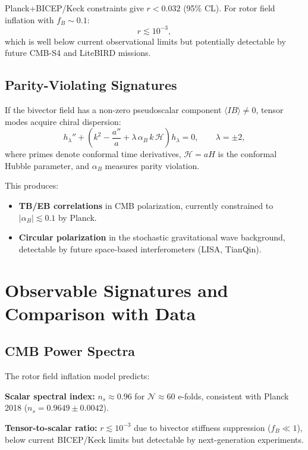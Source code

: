 \documentclass[11pt,a4paper]{article}
\numberwithin{equation}{section}
\theoremstyle{plain}
\theoremstyle{definition}
\theoremstyle{remark}
\begin{document}
Planck+BICEP/Keck constraints give $r < 0.032$ (95\% CL). For rotor field inflation with $f_B \sim 0.1$:
\begin{equation}
r \lesssim 10^{-3},
\end{equation}
which is well below current observational limits but potentially detectable by future CMB-S4 and LiteBIRD missions.

\subsection{Parity-Violating Signatures}

If the bivector field has a non-zero pseudoscalar component $\langle I B \rangle \neq 0$, tensor modes acquire chiral dispersion:
\begin{equation}
h_\lambda'' + \left(k^2 - \frac{a''}{a} + \lambda\,\alpha_B\,k\,\mathcal{H}\right)h_\lambda = 0,\qquad \lambda = \pm 2,
\label{eq:chiral-tensor}
\end{equation}
where primes denote conformal time derivatives, $\mathcal{H} = aH$ is the conformal Hubble parameter, and $\alpha_B$ measures parity violation.

This produces:
\begin{itemize}
  \item \textbf{TB/EB correlations} in CMB polarization, currently constrained to $|\alpha_B| \lesssim 0.1$ by Planck.
  \item \textbf{Circular polarization} in the stochastic gravitational wave background, detectable by future space-based interferometers (LISA, TianQin).
\end{itemize}

\section{Observable Signatures and Comparison with Data}
\label{sec:obs}

\subsection{CMB Power Spectra}

The rotor field inflation model predicts:

\textbf{Scalar spectral index:} $n_s \approx 0.96$ for $\mathcal{N} \approx 60$ e-folds, consistent with Planck 2018 ($n_s = 0.9649 \pm 0.0042$).

\textbf{Tensor-to-scalar ratio:} $r \lesssim 10^{-3}$ due to bivector stiffness suppression ($f_B \ll 1$), below current BICEP/Keck limits but detectable by next-generation experiments.
\end{document}
